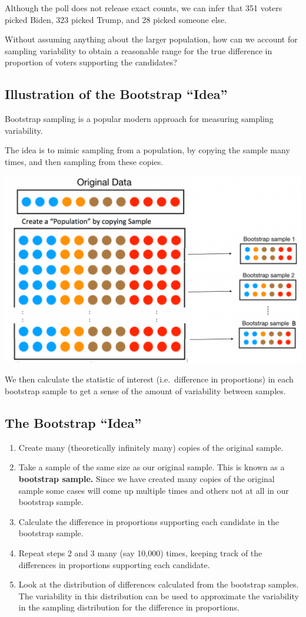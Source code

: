\documentclass[]{book}
\begin{document}
Although the poll does not release exact counts, we can infer that 351
voters picked Biden, 323 picked Trump, and 28 picked someone else.

Without assuming anything about the larger population, how can we
account for sampling variability to obtain a reasonable range for the
true difference in proportion of voters supporting the candidates?

\subsection{\texorpdfstring{Illustration of the Bootstrap
``Idea''}{Illustration of the Bootstrap Idea}}\label{illustration-of-the-bootstrap-idea}

Bootstrap sampling is a popular modern approach for measuring sampling
variability.

The idea is to mimic sampling from a population, by copying the sample
many times, and then sampling from these copies.

\includegraphics[width=0.5\linewidth]{Bootstrap_Idea}

We then calculate the statistic of interest (i.e.~difference in
proportions) in each bootstrap sample to get a sense of the amount of
variability between samples.

\subsection{\texorpdfstring{The Bootstrap
``Idea''}{The Bootstrap Idea}}\label{the-bootstrap-idea}

\begin{enumerate}
\def\labelenumi{\arabic{enumi}.}
\item
  Create many (theoretically infinitely many) copies of the original
  sample.
\item
  Take a sample of the same size as our original sample. This is known
  as a \textbf{bootstrap sample.} Since we have created many copies of
  the original sample some cases will come up multiple times and others
  not at all in our bootstrap sample.
\item
  Calculate the difference in proportions supporting each candidate in
  the bootstrap sample.
\item
  Repeat steps 2 and 3 many (say 10,000) times, keeping track of the
  differences in proportions supporting each candidate.
\item
  Look at the distribution of differences calculated from the bootstrap
  samples. The variability in this distribution can be used to
  approximate the variability in the sampling distribution for the
  difference in proportions.
\end{enumerate}
\end{document}
